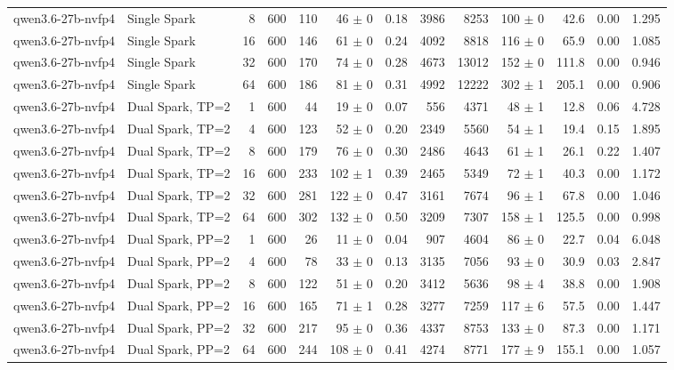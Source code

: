 \begin{tabular}{l l r r r r r r r r r r r}
qwen3.6-27b-nvfp4 & Single Spark & 8 & 600 & 110 & 46 $\pm$ 0 & 0.18 & 3986 & 8253 & 100 $\pm$ 0 & 42.6 & 0.00 & 1.295 \\
qwen3.6-27b-nvfp4 & Single Spark & 16 & 600 & 146 & 61 $\pm$ 0 & 0.24 & 4092 & 8818 & 116 $\pm$ 0 & 65.9 & 0.00 & 1.085 \\
qwen3.6-27b-nvfp4 & Single Spark & 32 & 600 & 170 & 74 $\pm$ 0 & 0.28 & 4673 & 13012 & 152 $\pm$ 0 & 111.8 & 0.00 & 0.946 \\
qwen3.6-27b-nvfp4 & Single Spark & 64 & 600 & 186 & 81 $\pm$ 0 & 0.31 & 4992 & 12222 & 302 $\pm$ 1 & 205.1 & 0.00 & 0.906 \\
\addlinespace
qwen3.6-27b-nvfp4 & Dual Spark, TP=2 & 1 & 600 & 44\rlap{$^\dagger$} & 19 $\pm$ 0 & 0.07 & 556 & 4371 & 48 $\pm$ 1 & 12.8 & 0.06 & 4.728 \\
qwen3.6-27b-nvfp4 & Dual Spark, TP=2 & 4 & 600 & 123 & 52 $\pm$ 0 & 0.20 & 2349 & 5560 & 54 $\pm$ 1 & 19.4 & 0.15 & 1.895 \\
qwen3.6-27b-nvfp4 & Dual Spark, TP=2 & 8 & 600 & 179 & 76 $\pm$ 0 & 0.30 & 2486 & 4643 & 61 $\pm$ 1 & 26.1 & 0.22 & 1.407 \\
qwen3.6-27b-nvfp4 & Dual Spark, TP=2 & 16 & 600 & 233 & 102 $\pm$ 1 & 0.39 & 2465 & 5349 & 72 $\pm$ 1 & 40.3 & 0.00 & 1.172 \\
qwen3.6-27b-nvfp4 & Dual Spark, TP=2 & 32 & 600 & 281 & 122 $\pm$ 0 & 0.47 & 3161 & 7674 & 96 $\pm$ 1 & 67.8 & 0.00 & 1.046 \\
qwen3.6-27b-nvfp4 & Dual Spark, TP=2 & 64 & 600 & 302 & 132 $\pm$ 0 & 0.50 & 3209 & 7307 & 158 $\pm$ 1 & 125.5 & 0.00 & 0.998 \\
\addlinespace
qwen3.6-27b-nvfp4 & Dual Spark, PP=2 & 1 & 600 & 26\rlap{$^\dagger$} & 11 $\pm$ 0 & 0.04 & 907 & 4604 & 86 $\pm$ 0 & 22.7 & 0.04 & 6.048 \\
qwen3.6-27b-nvfp4 & Dual Spark, PP=2 & 4 & 600 & 78\rlap{$^\dagger$} & 33 $\pm$ 0 & 0.13 & 3135 & 7056 & 93 $\pm$ 0 & 30.9 & 0.03 & 2.847 \\
qwen3.6-27b-nvfp4 & Dual Spark, PP=2 & 8 & 600 & 122 & 51 $\pm$ 0 & 0.20 & 3412 & 5636 & 98 $\pm$ 4 & 38.8 & 0.00 & 1.908 \\
qwen3.6-27b-nvfp4 & Dual Spark, PP=2 & 16 & 600 & 165 & 71 $\pm$ 1 & 0.28 & 3277 & 7259 & 117 $\pm$ 6 & 57.5 & 0.00 & 1.447 \\
qwen3.6-27b-nvfp4 & Dual Spark, PP=2 & 32 & 600 & 217 & 95 $\pm$ 0 & 0.36 & 4337 & 8753 & 133 $\pm$ 0 & 87.3 & 0.00 & 1.171 \\
qwen3.6-27b-nvfp4 & Dual Spark, PP=2 & 64 & 600 & 244 & 108 $\pm$ 0 & 0.41 & 4274 & 8771 & 177 $\pm$ 9 & 155.1 & 0.00 & 1.057 \\

\end{tabular}
